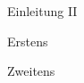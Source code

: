 
\begin{slide}{Einleitung II}
  \begin{itemstep}
    \item Erstens
    \item Zweitens
  \end{itemstep}
\end{slide}
